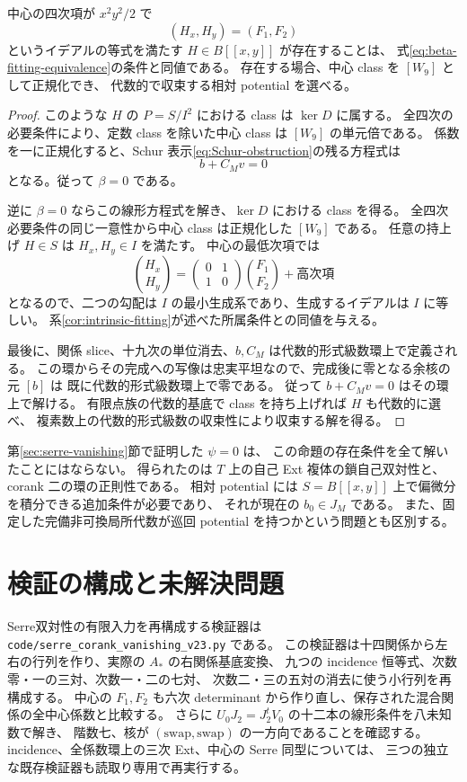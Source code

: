 \begin{proposition}\label{prop:potential-membership}
中心の四次項が $x^2y^2/2$ で
\[
 (H_x,H_y)=(F_1,F_2)
\]
というイデアルの等式を満たす $H\in B[[x,y]]$ が存在することは、
式\eqref{eq:beta-fitting-equivalence}の条件と同値である。
存在する場合、中心 class を $[W_9]$ として正規化でき、
代数的で収束する相対 potential を選べる。
\end{proposition}

\begin{proof}
このような $H$ の $P=S/I^2$ における class は $\ker D$ に属する。
全四次の必要条件により、定数 class を除いた中心 class は $[W_9]$ の単元倍である。
係数を一に正規化すると、Schur 表示\eqref{eq:Schur-obstruction}の残る方程式は
\[
 b+C_Mv=0
\]
となる。従って $\beta=0$ である。

逆に $\beta=0$ ならこの線形方程式を解き、$\ker D$ における class を得る。
全四次必要条件の同じ一意性から中心 class は正規化した $[W_9]$ である。
任意の持上げ $H\in S$ は $H_x,H_y\in I$ を満たす。
中心の最低次項では
\[
 \binom{H_x}{H_y}
 =\begin{pmatrix}0&1\\1&0\end{pmatrix}
   \binom{F_1}{F_2}+\text{高次項}
\]
となるので、二つの勾配は $I$ の最小生成系であり、生成するイデアルは $I$ に等しい。
系\ref{cor:intrinsic-fitting}が述べた所属条件との同値を与える。

最後に、関係 slice、十九次の単位消去、$b,C_M$ は代数的形式級数環上で定義される。
この環からその完成への写像は忠実平坦なので、完成後に零となる余核の元 $[b]$ は
既に代数的形式級数環上で零である。
従って $b+C_Mv=0$ はその環上で解ける。
有限点族の代数的基底で class を持ち上げれば $H$ も代数的に選べ、
複素数上の代数的形式級数の収束性により収束する解を得る。
\end{proof}

第\ref{sec:serre-vanishing}節で証明した $\psi=0$ は、
この命題の存在条件を全て解いたことにはならない。
得られたのは $T$ 上の自己 Ext 複体の鎖自己双対性と、corank 二の環の正則性である。
相対 potential には $S=B[[x,y]]$ 上で偏微分を積分できる追加条件が必要であり、
それが現在の $b_0\in J_M$ である。
また、固定した完備非可換局所代数が巡回 potential を持つかという問題とも区別する。

\section{検証の構成と未解決問題}\label{sec:verification}

Serre双対性の有限入力を再構成する検証器は \nolinkurl{code/serre_corank_vanishing_v23.py} である。
この検証器は十四関係から左右の行列を作り、実際の $A_*$ の右関係基底変換、
九つの incidence 恒等式、次数零・一の三対、次数一・二の七対、
次数二・三の五対の消去に使う小行列を再構成する。
中心の $F_1,F_2$ も六次 determinant から作り直し、保存された混合関係の全中心係数と比較する。
さらに $U_0J_2=J_2^tV_0$ の十二本の線形条件を八未知数で解き、
階数七、核が $(\text{swap},\text{swap})$ の一方向であることを確認する。
incidence、全係数環上の三次 Ext、中心の Serre 同型については、
三つの独立な既存検証器も読取り専用で再実行する。

